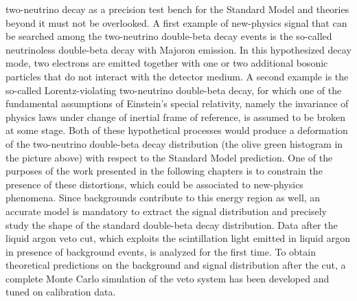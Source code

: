 two-neutrino decay as a precision test bench for the Standard Model and theories beyond it
must not be overlooked. A first example of new-physics signal that can be searched among
the two-neutrino double-beta decay events is the so-called neutrinoless double-beta decay
with Majoron emission. In this hypothesized decay mode, two electrons are emitted together
with one or two additional bosonic particles that do not interact with the detector
medium.  A second example is the so-called Lorentz-violating two-neutrino double-beta
decay, for which one of the fundamental assumptions of Einstein's special relativity,
namely the invariance of physics laws under change of inertial frame of reference, is
assumed to be broken at some stage. Both of these hypothetical processes would produce a
deformation of the two-neutrino double-beta decay distribution (the olive green histogram
in the picture above) with respect to the Standard Model prediction.  One of the purposes
of the work presented in the following chapters is to constrain the presence of these
distortions, which could be associated to new-physics phenomena. Since backgrounds
contribute to this energy region as well, an accurate model is mandatory to extract the
signal distribution and precisely study the shape of the standard double-beta decay
distribution. Data after the liquid argon veto cut, which exploits the scintillation light
emitted in liquid argon in presence of background events, is analyzed for the first time.
To obtain theoretical predictions on the background and signal distribution after the cut,
a complete Monte Carlo simulation of the veto system has been developed and tuned on
calibration data.

